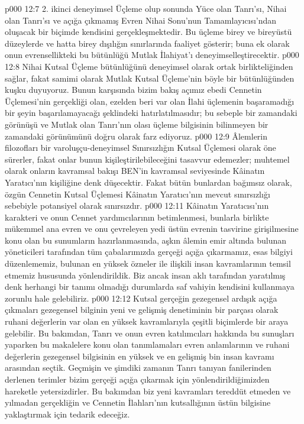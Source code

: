 \vs p000 12:7 2.\bibnobreakspace {} ikinci deneyimsel Üçleme olup sonunda Yüce olan Tanrı’sı, Nihai olan Tanrı’sı ve açığa çıkmamış Evren Nihai Sonu’nun Tamamlayıcısı’ndan oluşacak bir biçimde kendisini gerçekleşmektedir. Bu üçleme birey ve bireyüstü düzeylerde ve hatta birey dışılığın sınırlarında faaliyet gösterir; buna ek olarak onun evrensellikteki bu bütünlüğü Mutlak İlahiyat’ı deneyimselleştirecektir.
\vs p000 12:8 Nihai Kutsal Üçleme bütünlüğünü deneyimsel olarak ortak birlikteliğinden sağlar, fakat samimi olarak Mutlak Kutsal Üçleme’nin böyle bir bütünlüğünden kuşku duyuyoruz. Bunun karşısında bizim bakış açımız ebedi Cennetin Üçlemesi’nin gerçekliği olan, ezelden beri var olan İlahi üçlemenin başaramadığı bir şeyin başarılamayacağı şeklindeki hatırlatılmasıdır; bu sebeple  bir zamandaki görünüşü ve Mutlak olan Tanrı’nın olası üçleme bilgisinin bilinmeyen bir zamandaki görünümünü doğru olarak farz ediyoruz.
\vs p000 12:9 Âlemlerin filozofları bir varoluşçu\hyp{}deneyimsel Sınırsızlığın Kutsal Üçlemesi olarak öne sürerler, fakat onlar bunun kişileştirilebileceğini tasavvur edemezler; muhtemel olarak onların kavramsal bakışı BEN’in kavramsal seviyesinde Kâinatın Yaratıcı’nın kişiliğine denk düşecektir. Fakat bütün bunlardan bağımsız olarak, özgün Cennetin Kutsal Üçlemesi Kâinatın Yaratıcı’nın mevcut sınırsızlığı sebebiyle potansiyel olarak sınırsızdır.
\vs p000 12:11 Kâinatın Yaratıcısı’nın karakteri ve onun Cennet yardımcılarının betimlenmesi, bunlarla birlikte mükemmel ana evren ve onu çevreleyen yedi üstün evrenin tasvirine girişilmesine konu olan bu sunumların hazırlanmasında, aşkın âlemin emir altında bulunan yöneticileri tarafından tüm çabalarımızda gerçeği açığa çıkarmamız, esas bilgiyi düzenlememiz, bulunan en yüksek özneler ile ilişkili insan kavramlarının temsil etmemiz hususunda yönlendirildik. Biz ancak insan aklı tarafından yaratılmış denk herhangi bir tanımı olmadığı durumlarda saf vahiyin kendisini kullanmaya zorunlu hale gelebiliriz.
\vs p000 12:12 Kutsal gerçeğin gezegensel ardışık açığa çıkmaları gezegensel bilginin yeni ve gelişmiş denetiminin bir parçası olarak ruhani değerlerin var olan en yüksek kavramlarıyla çeşitli biçimlerde bir araya gelebilir. Bu bakımdan, Tanrı ve onun evren katılımcıları hakkında bu sunuşları yaparken bu makalelere konu olan tanımlamaları evren anlamlarının ve ruhani değerlerin gezegensel bilgisinin en yüksek ve en gelişmiş bin insan kavramı arasından seçtik. Geçmişin ve şimdiki zamanın Tanrı tanıyan fanilerinden derlenen terimler bizim gerçeği açığa çıkarmak için yönlendirildiğimizden hareketle yetersizdirler. Bu bakımdan biz yeni kavramları tereddüt etmeden ve yılmadan gerçekliğin ve Cennetin İlahları’nın kutsallığının üstün bilgisine yaklaştırmak için tedarik edeceğiz.

